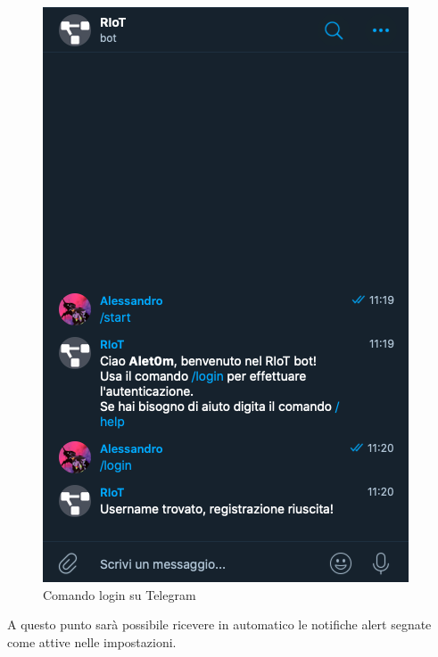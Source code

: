 		\begin{figure}[H]
		\centering
		\includegraphics[scale=0.600]{res/images/membro/loginTelegram.png}
		\caption{Comando login su Telegram}
	\end{figure}
	
		A questo punto sarà possibile ricevere in automatico le notifiche alert segnate come attive nelle impostazioni.
 

